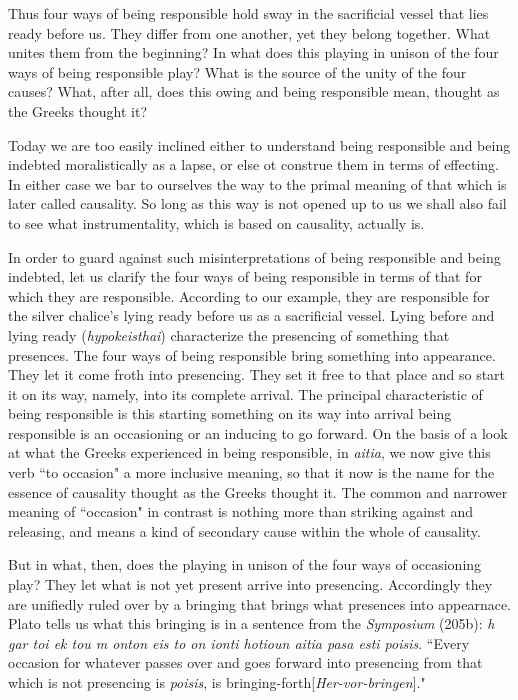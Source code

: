 Thus four ways of being responsible hold sway in the sacrificial vessel that lies ready before us. They differ from one another, yet they belong together. What unites them from the beginning? In what does this playing in unison of the four ways of being responsible play? What is the source of the unity of the four causes? What, after all, does this owing and being responsible mean, thought as the Greeks thought it?

Today we are too easily inclined either to understand being responsible and being indebted moralistically as a lapse, or else ot construe them in terms of effecting. In either case we bar to ourselves the way to the primal meaning of that which is later called causality. So long as this way is not opened up to us we shall also fail to see what instrumentality, which is based on causality, actually is.

In order to guard against such misinterpretations of being responsible and being indebted, let us clarify the four ways of being responsible in terms of that for which they are responsible. According to our example, they are responsible for the silver chalice's lying ready before us as a sacrificial vessel. Lying before and lying ready (\textit{hypokeisthai}) characterize the presencing of something that presences. The four ways of being responsible bring something into appearance. They let it come froth into presencing. They set it free to that place and so start it on its way, namely, into its complete arrival. The principal characteristic of being responsible is this starting something on its way into arrival being responsible is an occasioning or an inducing to go forward. On the basis of a look at what the Greeks experienced in being responsible, in \textit{aitia}, we now give this verb ``to occasion" a more inclusive meaning, so that it now is the name for the essence of causality thought as the Greeks thought it. The common and narrower meaning of ``occasion" in contrast is nothing more than striking against and releasing, and means a kind of secondary cause within the whole of causality.

But in what, then, does the playing in unison of the four ways of occasioning play? They let what is not yet present arrive into presencing. Accordingly they are unifiedly ruled over by a bringing that brings what presences into appearnace. Plato tells us what this bringing is in a sentence from the \textit{Symposium} (205b): \textit{h gar toi ek tou m onton eis to on ionti hotioun aitia pasa esti poisis}. ``Every occasion for whatever passes over and goes forward into presencing from that which is not presencing is \textit{poisis}, is bringing-forth[\textit{Her-vor-bringen}]."


